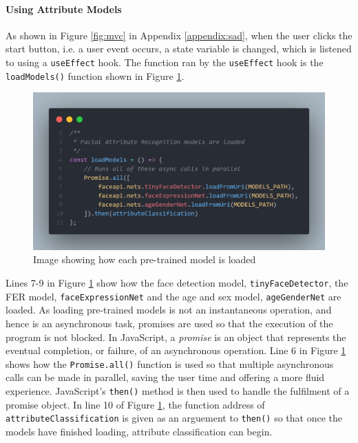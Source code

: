 \documentclass[12pt, a4paper]{article}
\newcommand{\np}
    {
    \vskip 0.4cm
    }
\begin{document}
\paragraph{Using Attribute Models}

As shown in Figure \ref{fig:mvc} in Appendix \ref{appendix:sad}, when the user clicks the start button, i.e. a user event occurs, a state variable is changed, which is listened to using a \verb+useEffect+ hook. The function ran by the \verb+useEffect+ hook is the \verb+loadModels()+ function shown in Figure \ref{fig:codefer}.

\begin{figure}[H]
    \centering
    \includegraphics[scale=0.28]{images/codefer.png}
    \caption{Image showing how each pre-trained model is loaded}
    \label{fig:codefer}
\end{figure}


Lines 7-9 in Figure \ref{fig:codefer} show how the face detection model, \verb+tinyFaceDetector+, the FER model, \verb+faceExpressionNet+ and the age and sex model, \verb+ageGenderNet+ are loaded. As loading pre-trained models is not an instantaneous operation, and hence is an asynchronous task, promises are used so that the execution of the program is not blocked. In JavaScript, a \textit{promise} is an object that represents the eventual completion, or failure, of an asynchronous operation. Line 6 in Figure \ref{fig:codefer} shows how the \verb+Promise.all()+ function is used so that multiple asynchronous calls can be made in parallel, saving the user time and offering a more fluid experience. JavaScript's \verb+then()+ method is then used to handle the fulfilment of a promise object. In line 10 of Figure \ref{fig:codefer}, the function address of \verb+attributeClassification+ is given as an arguement to \verb+then()+ so that once the models have finished loading, attribute classification can begin.
\np
\end{document}
